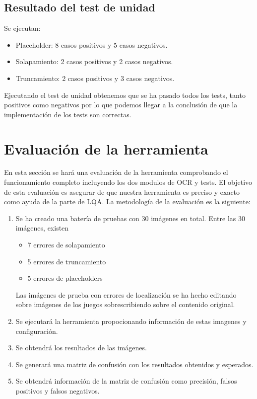\subsection{Resultado del test de unidad}
Se ejecutan:
\begin{itemize}
	\item Placeholder: 8 casos positivos y 5 casos negativos.
	\item Solapamiento: 2 casos positivos y 2 casos negativos.
	\item Truncamiento: 2 casos positivos y 3 casos negativos.
\end{itemize}
Ejecutando el test de unidad obtenemos que se ha pasado todos los tests, tanto positivos como negativos por lo que podemos llegar a la conclusión de que la implementación de los tests son correctas.


\section{Evaluación de la herramienta}
\label{sec:Evaluación_herramienta}
En esta sección se hará una evaluación de la herramienta comprobando el funcionamiento completo incluyendo los dos modulos de OCR y tests.
El objetivo de esta evaluación es asegurar de que nuestra herramienta es preciso y exacto como ayuda de la parte de LQA.
La metodología de la evaluación es la siguiente:
\begin{enumerate}
	\item Se ha creado una batería de pruebas con 30 imágenes en total. Entre las 30 imágenes, existen \begin{itemize}
		\item 7 errores de solapamiento
		\item 5 errores de truncamiento
		\item 5 errores de placeholders
	\end{itemize}
	Las imágenes de prueba con errores de localización se ha hecho editando sobre imágenes de los juegos sobrescribiendo sobre el contenido original.
	\item Se ejecutará la herramienta propocionando información de estas imagenes y configuración.
	\item Se obtendrá los resultados de las imágenes.
	\item Se generará una matriz de confusión con los resultados obtenidos y esperados.
	\item Se obtendrá información de la matriz de confusión como precisión, falsos positivos y falsos negativos.
\end{enumerate}
